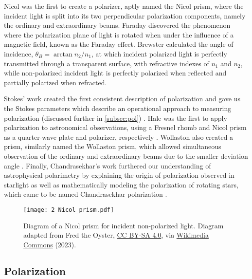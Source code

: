 Nicol was the first to create a polarizer, aptly named the Nicol prism, where the incident light is split into its two perpendicular polarization components, namely the ordinary and extraordinary beams.
Faraday discovered the phenomenon where the polarization plane of light is rotated when under the influence of a magnetic field, known as the Faraday effect.
Brewster calculated the angle of incidence, $\theta_{B} = \arctan{n_{2} / n_{1}}$, at which incident polarized light is perfectly transmitted through a transparent surface, with refractive indexes of $n_{1}$ and $n_{2}$, while non-polarized incident light is perfectly polarized when reflected and partially polarized when refracted.

\pagebreak

Stokes' work created the first consistent description of polarization and gave us the Stokes parameters which describe an operational approach to measuring polarization (discussed further in \autoref{subsec:pol}) \citep{Stokes}.
Hale was the first to apply polarization to astronomical observations, using a Fresnel rhomb and Nicol prism as a quarter-wave plate and polarizer, respectively \citep{Hale_pre,Hale_post}.
Wollaston also created a prism, similarly named the Wollaston prism, which allowed simultaneous observation of the ordinary and extraordinary beams due to the smaller deviation angle \citep{WollPrism}.
Finally, Chandrasekhar's work furthered our understanding of astrophysical polarimetry by explaining the origin of polarization observed in starlight as well as mathematically modeling the polarization of rotating stars, which came to be named Chandrasekhar polarization \citep{chandrasekhar}.

\begin{figure}[t]
    \centering
    \texttt{[image: 2\_Nicol\_prism.pdf]}
    \caption{
        Diagram of a Nicol prism for incident non-polarized light.
        Diagram adapted from Fred the Oyster, \protect\href{https://creativecommons.org/licenses/by-sa/4.0/}{CC BY-SA 4.0}, via \protect\href{https://en.m.wikipedia.org/wiki/File:Nicol_prism.svg}{Wikimedia Commons} (2023).
    }
    \label{fig:Nicol_prism}
\end{figure}

\subsection{Polarization} \label{subsec:pol}

